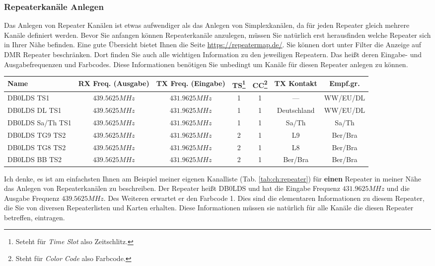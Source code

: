 \subsubsection{Repeaterkanäle Anlegen}
Das Anlegen von Repeater Kanälen ist etwas aufwendiger als das Anlegen von Simplexkanälen, da für jeden Repeater gleich mehrere Kanäle definiert werden. Bevor Sie anfangen können Repeaterkanäle anzulegen, müssen Sie natürlich erst herausfinden welche Repeater sich in Ihrer Nähe befinden. Eine gute Übersicht bietet Ihnen die Seite \url{https://repeatermap.de/}. Sie können dort unter Filter die Anzeige auf DMR Repeater beschränken. Dort finden Sie auch alle wichtigen Information zu den jeweiligen Repeatern. Das heißt deren Eingabe- und Ausgabefrequenzen und Farbcodes. Diese Informationen benötigen Sie unbedingt um Kanäle für diesen Repeater anlegen zu können.

\begin{sidewaystable}[p]
 \centering
 \begin{tabular}{|l|c|c|c|c|c|c|} \hline
  Name             & RX Freq. (Ausgabe) & TX Freq. (Eingabe) & TS\footnote{Seteht für \emph{Time Slot} also Zeitschlitz.} & CC\footnote{Steht für \emph{Color Code} also Farbcode.} & TX Kontakt & Empf.gr. \\ \hline
  DB0LDS TS1       & $439.5625 MHz$ & $431.9625 MHz$ & 1 & 1 & ---         & WW/EU/DL \\
  DB0LDS DL TS1    & $439.5625 MHz$ & $431.9625 MHz$ & 1 & 1 & Deutschland & WW/EU/DL \\
  DB0LDS Sa/Th TS1 & $439.5625 MHz$ & $431.9625 MHz$ & 1 & 1 & Sa/Th       & Sa/Th \\
  DB0LDS TG9 TS2    & $439.5625 MHz$ & $431.9625 MHz$ & 2 & 1 & L9          & Ber/Bra \\
  DB0LDS TG8 TS2    & $439.5625 MHz$ & $431.9625 MHz$ & 2 & 1 & L8          & Ber/Bra \\
  DB0LDS BB TS2    & $439.5625 MHz$ & $431.9625 MHz$ & 2 & 1 & Ber/Bra     & Ber/Bra \\ \hline
 \end{tabular}
 \caption{Beispielkonfiguration der Kanäle für den Repeater DB0LDS in Wildau bei Berlin.} \label{tab:ch:repeater}
\end{sidewaystable}

Ich denke, es ist am einfachsten Ihnen am Beispiel meiner eigenen Kanalliste (Tab. \ref{tab:ch:repeater}) für \textbf{einen} Repeater in meiner Nähe das Anlegen von Repeaterkanälen zu beschreiben. Der Repeater heißt DB0LDS und hat die Eingabe Frequenz $431.9625 MHz$ und die Ausgabe Frequenz $439.5625 MHz$. Des Weiteren erwartet er den Farbcode 1. Dies sind die elementaren Informationen zu diesem Repeater, die Sie von diversen Repeaterlisten und Karten erhalten. Diese Informationen müssen sie natürlich für alle Kanäle die diesen Repeater betreffen, eintragen.

